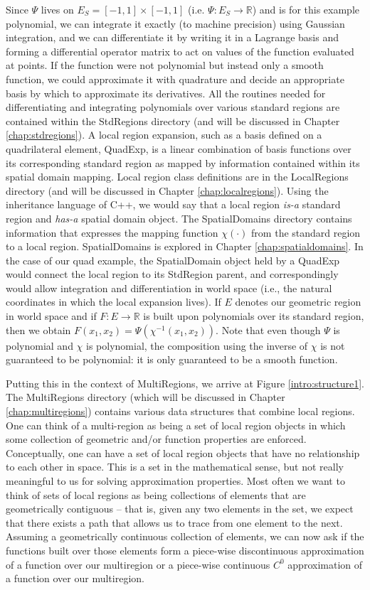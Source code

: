 Since $\Psi$ lives on $E_S = [-1,1] \times [-1,1]$ (i.e. $\Psi:E_S\rightarrow\mathbb{R}$) and is for this example polynomial, we can integrate it exactly (to machine precision) using Gaussian integration, and we can differentiate it by writing it in a Lagrange basis and forming a differential operator matrix to act on values of the function evaluated at points.   If the function were not polynomial but instead only a smooth function, we could approximate it with quadrature and decide an appropriate basis by which to 
approximate its derivatives.  All the routines needed for differentiating and integrating polynomials over various standard regions are contained within the StdRegions 
directory (and will be discussed in Chapter \ref{chap:stdregions}).   A local region expansion, such as a basis defined on a quadrilateral element, QuadExp, is a linear combination of basis functions over its corresponding standard region as mapped by
information contained within its spatial domain mapping.  Local region class definitions are in the LocalRegions directory (and will be discussed in Chapter \ref{chap:localregions}).  Using the inheritance language of C++, we would say that a local region {\em is-a} standard region and
{\em has-a} spatial domain object.  The SpatialDomains directory contains information that expresses the mapping function $\chi(\cdot)$ from the standard region
to a local region.  SpatialDomains is explored in Chapter \ref{chap:spatialdomains}.  In the case of our quad example, the SpatialDomain object held by a QuadExp would connect the local region to its StdRegion parent,
and correspondingly would allow integration and differentiation in world space (i.e., the natural coordinates in which the local expansion lives).  If $E$ denotes our
geometric region in world space and if $F:E\rightarrow\mathbb{R}$ is built upon polynomials over its standard region, then we obtain $F(x_1,x_2) = \Psi(\chi^{-1}(x_1,x_2))$.  Note that even though $\Psi$ is polynomial and $\chi$ is polynomial, the composition using the inverse of $\chi$ is not guaranteed to be polynomial: it is only
guaranteed to be a smooth function. 

Putting this in the context of MultiRegions, we arrive at Figure \ref{intro:structure1}.  The MultiRegions directory (which will be discussed in Chapter \ref{chap:multiregions}) contains various data structures that combine
local regions.  One can think of a multi-region as being a set of local region objects in which some collection of geometric and/or function properties are enforced.
Conceptually, one can have a set of local region objects that have no relationship to each other in space.   This is a set in the mathematical sense, but not really
meaningful to us for solving approximation properties.  Most often we want to think of sets of local regions as being collections of elements that are geometrically
contiguous -- that is, given any two elements in the set, we expect that there exists a path that allows us to trace from one element to the next.   Assuming
a geometrically continuous collection of elements, we can now ask if the functions built over those elements form a piece-wise discontinuous approximation
of a function over our multiregion or a piece-wise continuous $C^0$ approximation of a function over our multiregion.

